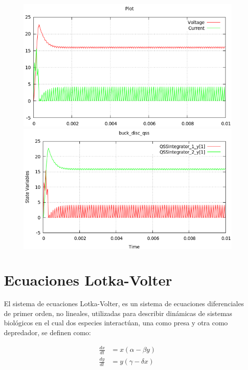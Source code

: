 \begin{figure}[H]
\centering
\begin{minipage}{0.5\textwidth}
\centering
 \includegraphics[width=\linewidth]{buck_disk-pd}
\end{minipage}\hfill
\begin{minipage}{0.5\textwidth}
\centering
 \includegraphics[width=\linewidth]{buck_disk-qss}
\end{minipage}
\end{figure}

\section{Ecuaciones Lotka-Volter}

	El sistema de ecuaciones Lotka-Volter, es un sistema de ecuaciones diferenciales de primer orden, no lineales, utilizadas para describir dinámicas de sistemas biológicos en el cual dos especies interactúan, una como presa y otra como depredador, se definen como:

\begin{align*}
\frac{dx}{dt} & = x(\alpha - \beta y)\\
\frac{dy}{dt} & =y(\gamma - \delta  x)
\end{align*}

